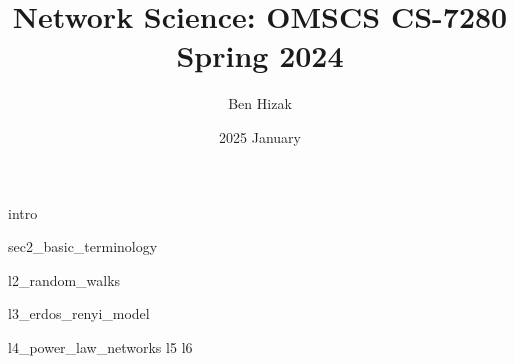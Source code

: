 \documentclass{article}
\title{Network Science: OMSCS CS-7280 Spring 2024}
\author{Ben Hizak}
\date{2025 January}
\begin{document}
\maketitle
{intro}
\newpage

{sec2_basic_terminology}
\newpage

{l2_random_walks}
\newpage

{l3_erdos_renyi_model}
\newpage

{l4_power_law_networks}
\newpage
{l5}
\newpage
{l6}
\newpage
\end{document}

